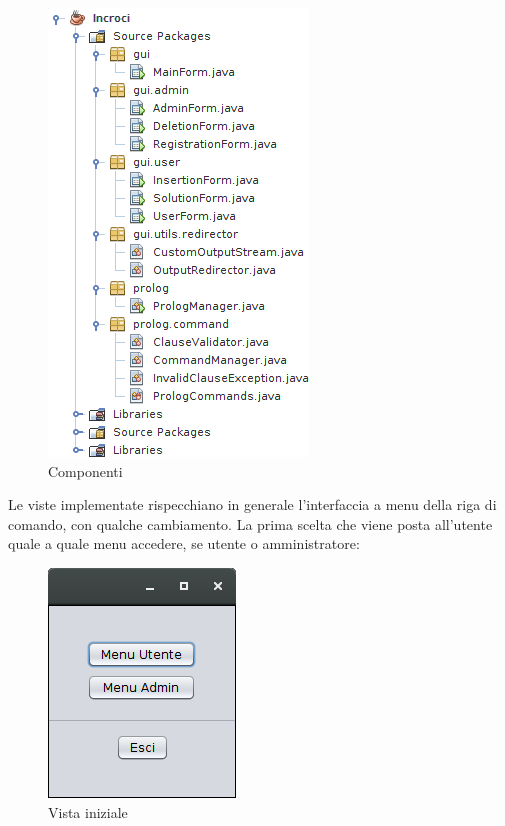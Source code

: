 \begin{figure}[!htbp]
	\centering
	\includegraphics[width=.4\textwidth]{images/java}
	\caption{Componenti}
\end{figure}

\clearpage
Le viste implementate rispecchiano in generale l'interfaccia a menu della riga di comando, con qualche cambiamento. La prima scelta che viene posta all'utente quale a quale menu accedere, se utente o amministratore:

\begin{figure}[!htbp]
	\centering
	\includegraphics[width=.3\textwidth]{images/gui/menu_gui}
	\caption{Vista iniziale}
\end{figure}

